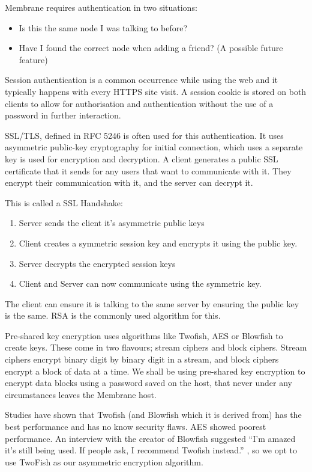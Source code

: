 \documentclass[11pt, a4paper, twoside]{report}
\begin{document}
Membrane requires authentication in two situations:
\begin{itemize}
 \item Is this the same node I was talking to before?
 \item Have I found the correct node when adding a friend? (A possible future feature)
\end{itemize}

Session authentication is a common occurrence while using the web and it typically happens with every HTTPS site visit. A session cookie is stored on both clients to allow for authorisation and authentication without the use of a password in further interaction. \citep{mayo2008security}

SSL/TLS, defined in RFC 5246 \citep{dierks2008transport} is often used for this authentication. It uses asymmetric public-key cryptography for initial connection, which uses a separate key is used for encryption and decryption. A client generates a public SSL certificate that it sends for any users that want to communicate with it. They encrypt their communication with it, and the server can decrypt it.

This is called a SSL Handshake:

\begin{enumerate}
 \item Server sends the client it's asymmetric public keys
 \item Client creates a symmetric session key and encrypts it using the public key.
 \item Server decrypts the encrypted session keys
 \item Client and Server can now communicate using the symmetric key.
\end{enumerate}

The client can ensure it is talking to the same server by ensuring the public key is the same. RSA is the commonly used algorithm for this.

Pre-shared key encryption uses algorithms like Twofish, AES or Blowfish to create keys. These come in two flavours; stream ciphers and block ciphers. Stream ciphers encrypt binary digit by binary digit in a stream, and block ciphers encrypt a block of data at a time. We shall be using pre-shared key encryption to encrypt data blocks using a password saved on the host, that never under any circumstances leaves the Membrane host.

Studies have shown that Twofish (and Blowfish which it is derived from) has the best performance and has no know security flaws. AES showed poorest performance. \citep*{thakur2011aes, rizvi2011performance, mushtaque2014evaluation} An interview with the creator of Blowfish suggested ``I'm amazed it's still being used. If people ask, I recommend Twofish instead.'' \cite{fish2007bruce}, so we opt to use TwoFish as our asymmetric encryption algorithm.
\end{document}
